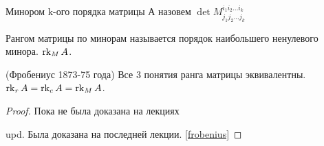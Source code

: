 \begin{definition}
	Минором k-ого порядка матрицы А назовем \(\det M_{j_1j_2\ldots j_k}^{i_1i_2\ldots i_k}\)
\end{definition}
\begin{definition}
	Рангом матрицы по минорам называется порядок наибольшего ненулевого минора. \(\operatorname{rk}_MA\).
\end{definition}
\begin{theorem}
	(Фробениус 1873-75 года)\newline
	Все 3 понятия ранга матрицы эквивалентны. \newline
	\(\operatorname{rk}_rA = \operatorname{rk}_cA = \operatorname{rk}_MA\).
\end{theorem}
\begin{proof}
	Пока не была доказана на лекциях

	upd. Была доказана на последней лекции. \eqref{frobenius}
\end{proof}